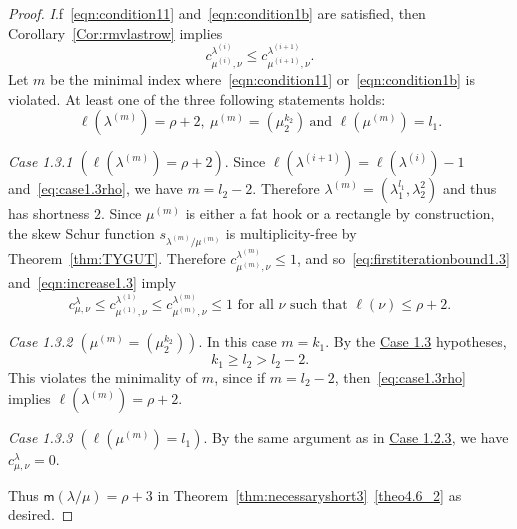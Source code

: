 \documentclass[ALCO,ThmDefs,Unicode,epreuves]{cedram}
\newcommand{\msf}{\mathsf{m}}
\let\hypertargeta\hypertarget %
\let\hyperlinka\hyperlink %
\newenvironment{Case}[1]{\par\vskip2pt\noindent%
\emph{#1}.}{\vskip2pt}
\begin{document}
\begin{proof}
\begin{Case}
If~\eqref{eqn:condition11} and~\eqref{eqn:condition1b} are satisfied, then Corollary~\ref{Cor:rmvlastrow} implies
\begin{equation}\label{eqn:increase1.3}
 c^{\lambda^{(i)}}_{\mu^{(i)},\nu} \leq c^{\lambda^{(i+1)}}_{\mu^{(i+1)},\nu}.
\end{equation}
Let $m$ be the minimal index where~\eqref{eqn:condition11} or~\eqref{eqn:condition1b} is violated. At least one of the three following statements holds: 
\[
\ell(\lambda^{(m)}) = \rho+2,\ \mu^{(m)} = (\mu_2^{k_2})\ \text{and } \ell(\mu^{(m)}) = l_1.
\]
\end{Case}

\begin{Case}
{\hypertargeta{theo4.6_case1.3.1}{Case 1.3.1} $(\ell(\lambda^{(m)}) = \rho+2)$} 
Since $\ell(\lambda^{(i+1)}) = \ell(\lambda^{(i)})-1$ and~\eqref{eq:case1.3rho}, we have $m = l_2-2$. Therefore $\lambda^{(m)} = (\lambda_1^{l_1},\lambda_2^{2})$ and thus has shortness $2$. Since $\mu^{(m)}$ is either a fat hook or a rectangle by construction, the skew Schur function $s_{\lambda^{(m)}/\mu^{(m)}}$ is multiplicity-free by Theorem~\ref{thm:TYGUT}. Therefore $c^{\lambda^{(m)}}_{\mu^{(m)},\nu} \leq 1$, and so~\eqref{eq:firstiterationbound1.3} and~\eqref{eqn:increase1.3} imply
\[
c^{\lambda}_{\mu,\nu} \leq c^{\lambda^{(1)}}_{\mu^{(1)},\nu}\leq c^{\lambda^{(m)}}_{\mu^{(m)},\nu} \leq 1\text{ for all }\nu\text{ such that }\ell(\nu)\leq \rho+2.
\]
\end{Case}

\begin{Case}
{\hypertargeta{theo4.6_case1.3.2}{Case 1.3.2} $(\mu^{(m)} = (\mu_2^{k_2}))$} 
In this case $m = k_1$. By the \hyperlinka{theo4.6_case1.3}{Case 1.3} hypotheses,
\[
k_1 \geq l_2 > l_2-2.
\]
This violates the minimality of $m$, since if $m=l_2 - 2$, then~\eqref{eq:case1.3rho} implies $\ell(\lambda^{(m)}) = \rho+2$.
\end{Case}

\begin{Case}
{\hypertargeta{theo4.6_case1.3.3}{Case 1.3.3} $(\ell(\mu^{(m)}) = l_1)$} 
By the same argument as in \hyperlinka{theo4.6_case1.2.3}{Case 1.2.3}, we have $c^{\lambda}_{\mu,\nu} = 0$. 

Thus ${\msf }(\lambda/\mu) = \rho+3$ in Theorem~\ref{thm:necessaryshort3}~\ref{theo4.6_2} as desired.
\end{Case}


\end{proof}
\end{document}
